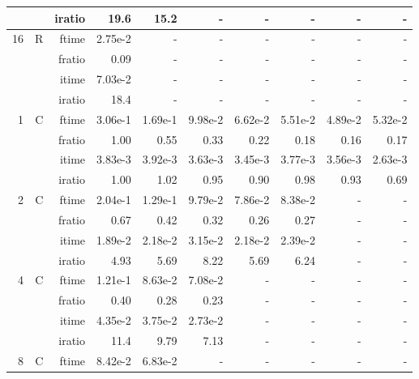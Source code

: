 \documentclass[a4paper]{article}
\begin{document}
\begin{table}[htbp]
\begin{center}
\begin{small}
\begin{tabular}{|r|r|r|r|r|r|r|r|r|r|}
             &             &  iratio &    19.6 &   15.2 &     - &      - &      - &      - &      - \\\hline
   16 &   R &   ftime &    2.75e-2 &      - &      - &      - &      - &      - &      - \\
             &             &  fratio &    0.09 &     - &      - &      - &      - &      - &      - \\
             &             &  itime &    7.03e-2 &      - &      - &      - &      - &      - &      - \\
             &             &  iratio &    18.4 &     - &      - &      - &      - &      - &      - \\\hline\hline
   1 &   C &  ftime &    3.06e-1 &    1.69e-1 &    9.98e-2 &    6.62e-2 &    5.51e-2 &    4.89e-2 &    5.32e-2 \\
             &             &  fratio &    1.00 &    0.55 &    0.33 &   0.22 &    0.18 &    0.16 &    0.17 \\
             &             &  itime &    3.83e-3 &    3.92e-3 &    3.63e-3 &    3.45e-3 &    3.77e-3 &    3.56e-3 &    2.63e-3 \\
             &             &  iratio &    1.00 &    1.02  &    0.95 &    0.90 &    0.98 &    0.93 &   0.69 \\\hline
   2 &  C &  ftime &    2.04e-1 &    1.29e-1 &    9.79e-2 &    7.86e-2 &    8.38e-2 &      - &      - \\
             &             &  fratio &    0.67 &    0.42 &   0.32 &    0.26 &    0.27 &      - &      - \\
             &             &  itime &    1.89e-2 &    2.18e-2 &    3.15e-2 &    2.18e-2 &    2.39e-2 &      - &      - \\
             &             &  iratio &    4.93  &    5.69  &    8.22  &    5.69  &    6.24  &      - &      - \\\hline
   4 &  C &  ftime &    1.21e-1 &    8.63e-2 &    7.08e-2 &      - &      - &      - &      - \\
             &             &  fratio &    0.40 &    0.28 &    0.23 &      - &      - &      - &      - \\
             &             &  itime &    4.35e-2 &    3.75e-2 &    2.73e-2 &      - &      - &      - &      - \\
             &             &  iratio &    11.4 &   9.79  &    7.13  &      - &      - &      - &      - \\\hline
   8 &   C &  ftime &    8.42e-2 &    6.83e-2 &      - &      - &      - &      - &      - \\

\end{tabular}
\end{small}
\end{center}
\end{table}
\end{document}

